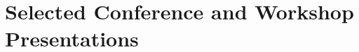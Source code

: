 \documentclass[letterpaper,10pt]{article} %
\begin{document}
\begin{description}[itemsep=-1ex]
%
%
%
%
%

\end{description}

\bigskip
\section*{Selected Conference and Workshop Presentations}
\bigskip
\end{document}
